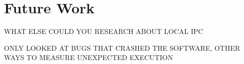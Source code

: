 \chapter{Future Work}
\label{sec:futureWork}

WHAT ELSE COULD YOU RESEARCH ABOUT LOCAL IPC

ONLY LOOKED AT BUGS THAT CRASHED THE SOFTWARE, OTHER WAYS TO MEASURE UNEXPECTED EXECUTION
